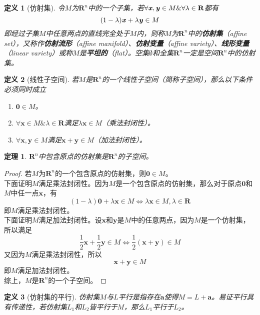 \documentclass[a4paper,11pt,oneside]{article}
\newtheorem{definition}{定义}[section]
\newtheorem{theorem}{定理}[section]
\newtheorem{proof}{证明}[section]
\begin{document}
			\begin{definition}[仿射集]
				令$M$为$\textbf{R}^{n}$中的一个子集，若$\forall \textbf{\textit{x}}, \textbf{\textit{y}} \in M \& \forall \lambda \in \textbf{R}$都有
				$$(1-\lambda)\textbf{\textit{x}}+\lambda\textbf{\textit{y}} \in M$$
				即经过子集$M$中任意两点的直线完全处于$M$内，则称$M$为$\textbf{R}^{n}$中的\textbf{仿射集}（affine set），又称作\textbf{仿射流形}（affine manifold）、\textbf{仿射变量}（affine variety）、\textbf{线形变量}（linear variety）或称$M$是\textbf{平坦的}（flat）。空集$\emptyset$和全集$\textbf{R}^{n}$一定是空间$\textbf{R}^{n}$中的仿射集。
			\end{definition}
			\begin{definition}[线性子空间]
				若$M$是$\textbf{R}^{n}$的一个线性子空间（简称子空间），那么以下条件必须同时成立
				\begin{enumerate}
					\item $\textbf{0} \in M$。
					\item $\forall \textbf{x} \in M \& \lambda \in \textbf{R}$满足$\lambda \textbf{x} \in M$（乘法封闭性）。
					\item $\forall \textbf{x},\textbf{y} \in M$满足$\textbf{x}+\textbf{y} \in M$（加法封闭性）。
				\end{enumerate}
			\end{definition}
			\begin{theorem}
				\label{the:theorem1}
				$\textbf{R}^{n}$中包含原点的仿射集是$\textbf{R}^{n}$的子空间。
			\end{theorem}
			\begin{proof}
				若$M$为$\textbf{R}^{n}$的一个包含原点的仿射集，则$\textbf{0} \in M$。\\
				下面证明$M$满足乘法封闭性。因为$M$是一个包含原点的仿射集，那么对于原点$\textbf{0}$和$M$中任一点$\textbf{x}$，有
				$$(1-\lambda)\textbf{0}+\lambda \textbf{x} \in M \Leftrightarrow \lambda \textbf{x} \in M, \lambda \in \textbf{R}$$
				即$M$满足乘法封闭性。\\
				下面证明$M$满足加法封闭性。设$\textbf{x}$和$\textbf{y}$是$M$中的任意两点，因为$M$是一个仿射集，所以满足
				$$\frac{1}{2} \textbf{x} + \frac{1}{2} \textbf{y} \in M \Leftrightarrow \frac{1}{2} (\textbf{x} + \textbf{y}) \in M$$
				又因为$M$满足乘法封闭性，所以
				$$\textbf{x} + \textbf{y} \in M$$
				即$M$满足加法封闭性。\\
				综上，$M$是$\textbf{R}^{n}$的一个子空间。
			\end{proof}
			\begin{definition}[仿射集的平行]
				仿射集$M$与$L$平行是指存在$\textbf{a}$使得$M=L+\textbf{a}$。易证平行具有传递性，若仿射集$L_{1}$和$L_{2}$皆平行于$M$，那么$L_{1}$平行于$L_{2}$。
			\end{definition}
\end{document}
